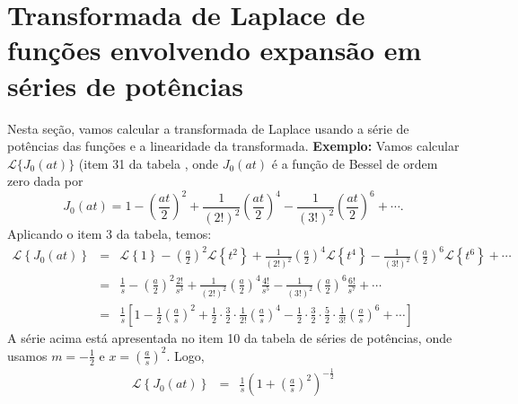 \documentclass[a4paper,10pt]{book}
\begin{document}
\section{Transformada de Laplace de funções envolvendo expansão em séries de potências}
 Nesta seção, vamos calcular a transformada de Laplace usando a série de potências das funções e a linearidade da transformada.
{\bf Exemplo:} Vamos calcular $\mathcal{L}\{J_0(at)\}$ (item 31 da tabela , onde $J_0(at)$ é a função de Bessel de ordem zero dada por
 \begin{equation}
 J_0(at)=1-\left(\frac{at}{2}\right)^2+\frac{1}{(2!)^2}\left(\frac{at}{2}\right)^4-\frac{1}{(3!)^2}\left(\frac{at}{2}\right)^6+\cdots.
 \end{equation}
 Aplicando o item 3 da tabela, temos:
 \begin{eqnarray*}
 \mathcal{L}\left\{J_0(at)\right\}&=&\mathcal{L}\left\{1\right\}-\left(\frac{a}{2}\right)^2\mathcal{L}\left\{t^2\right\}+\frac{1}{(2!)^2}\left(\frac{a}{2}\right)^4\mathcal{L}\left\{t^4\right\}-\frac{1}{(3!)^2}\left(\frac{a}{2}\right)^6\mathcal{L}\left\{t^6\right\}+\cdots\\
 &=&\frac{1}{s}-\left(\frac{a}{2}\right)^2\frac{2!}{s^3}+\frac{1}{(2!)^2}\left(\frac{a}{2}\right)^4\frac{4!}{s^5}-\frac{1}{(3!)^2}\left(\frac{a}{2}\right)^6\frac{6!}{s^7}+\cdots\\
 &=&\frac{1}{s}\left[1-\frac{1}{2}\left(\frac{a}{s}\right)^2+\frac{1}{2}\cdot \frac{3}{2}\cdot \frac{1}{2!}\left(\frac{a}{s}\right)^4-\frac{1}{2}\cdot\frac{3}{2}\cdot \frac{5}{2}\cdot\frac{1}{3!} \left(\frac{a}{s}\right)^6+\cdots\right]
 \end{eqnarray*}
 A série acima está apresentada no item 10 da tabela de séries de potências, onde usamos $m=-\frac{1}{2}$ e $x=\left(\frac{a}{s}\right)^2$. Logo,
 \begin{eqnarray*}
 \mathcal{L}\left\{J_0(at)\right\}&=&\frac{1}{s}\left(1+\left(\frac{a}{s}\right)^2\right)^{-\frac{1}{2}}
 \end{eqnarray*}
\end{document}
